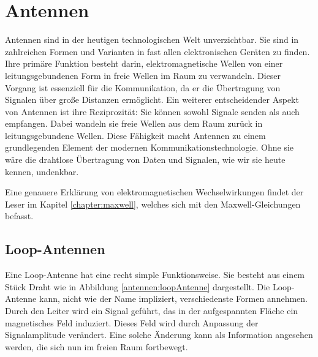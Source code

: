 %
%
% 
%
%

\section{Antennen\label{antennen:antennenAllgemein}}


Antennen sind in der heutigen technologischen Welt unverzichtbar.
Sie sind in zahlreichen Formen und Varianten in fast allen
elektronischen Geräten zu finden. Ihre primäre Funktion besteht
darin, elektromagnetische Wellen von einer leitungsgebundenen Form
%
%
in freie Wellen im Raum zu verwandeln. Dieser Vorgang ist essenziell
für die Kommunikation, da er die Übertragung von Signalen über große
Distanzen ermöglicht. Ein weiterer entscheidender Aspekt von Antennen
ist ihre Reziprozität: Sie können sowohl Signale senden als auch
%
empfangen. Dabei wandeln sie freie Wellen aus dem Raum zurück in
leitungsgebundene Wellen. Diese Fähigkeit macht Antennen zu einem
grundlegenden Element der modernen Kommunikationstechnologie. Ohne
sie wäre die drahtlose Übertragung von Daten und Signalen, wie wir
sie heute kennen, undenkbar.

Eine genauere Erklärung von elektromagnetischen Wechselwirkungen findet der Leser im Kapitel \ref{chapter:maxwell},
welches sich mit den Maxwell-Gleichungen befasst. 
%

\subsection{Loop-Antennen\label{antennen:antennenAllgemein_loop}}


Eine Loop-Antenne hat eine recht simple Funktionsweise. Sie besteht aus einem Stück Draht wie in Abbildung \ref{antennen:loopAntenne} dargestellt. Die Loop-Antenne kann, nicht wie der Name impliziert, verschiedenste Formen annehmen. Durch den Leiter wird ein Signal geführt, das in der aufgespannten Fläche ein magnetisches Feld induziert. Dieses Feld wird durch Anpassung der Signalamplitude verändert. Eine solche Änderung kann als Information angesehen werden, die sich nun im freien Raum fortbewegt.



